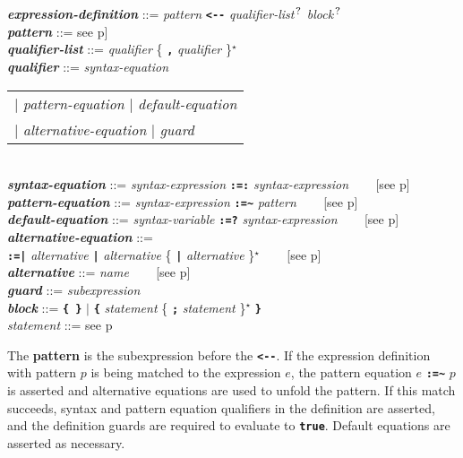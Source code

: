 \documentclass[12pt]{article}
\newcommand{\TT}[1]{{\tt \bfseries #1}}
\newcommand{\key}[1]{{\rm \bfseries #1}}
\newcommand{\emkey}[1]{{\em \bfseries #1}}
\newcommand{\pagref}[1]{p\pageref{#1}}
\newcommand{\STAR}{{\Large $^\star$}}
\newcommand{\QMARK}{{$^{\,\mbox{\footnotesize ?}}$}}
\newcommand{\TILDE}{\textasciitilde}
\newenvironment{indpar}[1][0.3in]%
	{\begin{list}{}%
		     {\setlength{\itemsep}{0in}%
		      \setlength{\topsep}{0in}%
		      \setlength{\parsep}{1ex}%
		      \setlength{\labelwidth}{#1}%
		      \setlength{\leftmargin}{#1}%
		      \addtolength{\leftmargin}{\labelsep}}%
	 \item}%
	{\end{list}}
\begin{document}
\begin{indpar}
\emkey{expression-definition} ::=
	{\em pattern} \TT{<-{}-} {\em qualifier-list}\QMARK{}
	                         {\em block}\QMARK{} \\[1ex]
\emkey{pattern} ::= see \pagref{PATTERN}] \\[1ex]
\emkey{qualifier-list}
    ::= {\em qualifier} \{ \TT{,} {\em qualifier} \}\STAR{} \\[1ex]
\emkey{qualifier} ::= {\em syntax-equation}
		       \begin{tabular}[t]{@{}l@{}}
		       $|$ {\em pattern-equation} $|$ {\em default-equation} \\
		       $|$ {\em alternative-equation} $|$ {\em guard}
		       \end{tabular} \\[1ex]
\emkey{syntax-equation} ::= {\em syntax-expression}
		\TT{:=:} {\em syntax-expression}
	        ~~~ [see \pagref{SYNTAX-EQUATIONS}]
	 	\\[1ex]
\emkey{pattern-equation} ::= {\em syntax-expression}
		\TT{:=\TILDE} {\em pattern}
	        ~~~ [see \pagref{PATTERN-EQUATIONS}]
		\\[1ex]
\emkey{default-equation} ::= {\em syntax-variable}
		\TT{:=?} {\em syntax-expression}
	        ~~~ [see \pagref{DEFAULT-EQUATIONS}]
		\\[1ex]
\emkey{alternative-equation} ::= \\
\hspace*{3em}{\em syntax-variable}
		\TT{:=|} {\em alternative}
		          \TT{|} {\em alternative}
			  \{ \TT{|} {\em alternative} \}\STAR{}
	                  ~~~ [see \pagref{ALTERNATIVE-EQUATIONS}]
		\\[1ex]
\emkey{alternative} ::= {\em name} ~~~ [see \pagref{NAME}]
		\\[1ex]
\emkey{guard} ::= {\em subexpression} \\[1ex]
\emkey{block} ::= \TT{\{~\}} $|$ \TT{\{} {\em statement}
                           \{ \TT{;} {\em statement} \}\STAR{} \TT{\}}
	    \\[1ex]
{\em statement} ::= see \pagref{STATEMENT}
\end{indpar}

The \key{pattern}
is the subexpression before the \TT{<-{}-}.  If the expression definition
with pattern $p$ is being matched to the expression $e$,
the pattern equation $e$ \TT{:=\TILDE} $p$ is asserted and
alternative equations are used to unfold the pattern.  If this
match succeeds, syntax and pattern equation qualifiers in the definition
are asserted, and the definition guards are required to evaluate
to \TT{true}.
Default equations are asserted as necessary.
\end{document}

